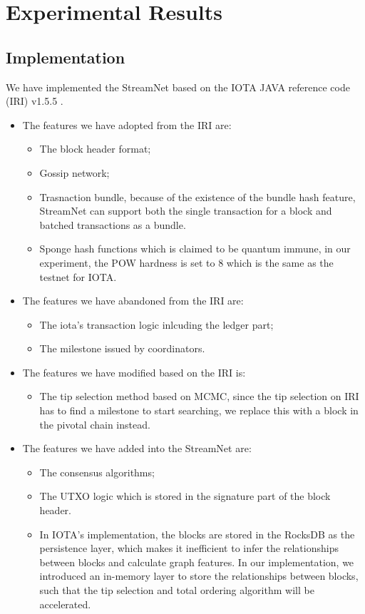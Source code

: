 \section{Experimental Results}

\subsection{Implementation}
We have implemented the StreamNet based on the IOTA JAVA reference code (IRI) v1.5.5 \cite{IOTACode}.

\begin{itemize}
    \item The features we have adopted from the IRI are: 
    \begin{itemize}
        \item The block header format;
        \item Gossip network;
        \item Trasnaction bundle, because of the existence of the bundle hash feature, StreamNet can support both the single transaction for a block and batched transactions as a bundle. 
        \item Sponge hash functions which is claimed to be quantum immune, in our experiment, the POW hardness is set to 8 which is the same as the testnet for IOTA.
    \end{itemize}

    \item The features we have abandoned from the IRI are:
    \begin{itemize}
        \item The iota's transaction logic inlcuding the ledger part;
        \item The milestone issued by coordinators. 
    \end{itemize}

    \item The features we have modified based on the IRI is: 
    \begin{itemize}
        \item The tip selection method based on MCMC, since the tip selection on IRI has to find a milestone to start searching, we replace this with a block in the pivotal chain instead.
    \end{itemize}


    \item The features we have added into the StreamNet are: 
    \begin{itemize}
        \item The consensus algorithms; 
        \item The UTXO logic which is stored in the signature part of the block header. 
        \item In IOTA's implementation, the blocks are stored in the RocksDB \cite{RocksDB} as the persistence layer, which makes it inefficient to infer the relationships between blocks and calculate graph features. In our implementation, we introduced an in-memory layer to store the relationships between blocks, such that the tip selection and total ordering algorithm will be accelerated. 
    \end{itemize}
\end{itemize}

